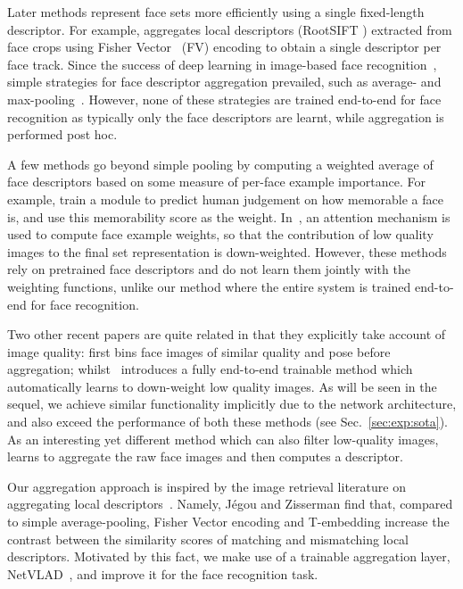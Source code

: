 \documentclass[runningheads]{llncs}
\begin{document}
Later methods represent face sets
more efficiently using a single fixed-length descriptor.
For example, \cite{Parkhi14} aggregates local descriptors
(RootSIFT \cite{Arandjelovic12}) extracted 
from face crops using
Fisher Vector~\cite{Perronnin10} (FV) 
encoding to obtain a single 
descriptor per face track. Since the success of 
deep learning in image-based face 
recognition~\cite{Taigman14,Parkhi15,Schroff15,Sun15,Liu17b,Zheng18,Cao18a}, 
simple strategies for face descriptor aggregation prevailed,
such as average- and 
max-pooling~\cite{Parkhi15,Chen15}.
However, none of these strategies are trained end-to-end
for face recognition as typically only the face descriptors
are learnt, while aggregation is performed post hoc.

A few methods go beyond simple pooling by computing a weighted
average of face descriptors based on some measure of
per-face example importance.
For example, \cite{Goswami14} train a module to predict human
judgement on how memorable a face is, and use this memorability score 
as the weight.
In~\cite{Yang17},
an attention mechanism is used to compute face example weights,
so that the contribution of low quality images
to the final set representation is down-weighted.
However, these methods rely on pretrained face descriptors
and do not learn them
jointly with the weighting functions,
unlike our method where the entire system is trained end-to-end
for face recognition.

Two other recent papers are quite related in that 
they explicitly take account of image quality:
\cite{Hassner16} first bins 
face images of similar quality and pose before aggregation; whilst~\cite{Liu17} introduces a fully end-to-end trainable
method which automatically learns to down-weight low quality images. As will be seen in the sequel, we achieve similar 
functionality implicitly due to the network architecture, and also exceed the performance of both these methods
(see Sec.~\ref{sec:exp:sota}).
As an interesting yet different method 
which can also filter low-quality images, 
\cite{Rao17} learns to  aggregate  the raw face images and then computes a 
descriptor.



Our aggregation approach is inspired by the image retrieval literature
on aggregating local descriptors~\cite{Jegou14,Arandjelovic16}.
Namely, J\'egou and Zisserman \cite{Jegou14} find that,
compared to simple average-pooling,
Fisher Vector encoding and T-embedding increase
the contrast between the similarity scores of 
matching and mismatching local descriptors.
Motivated by this fact, we make use of a trainable aggregation layer,
NetVLAD~\cite{Arandjelovic16}, and improve it for the face recognition task.
\end{document}
